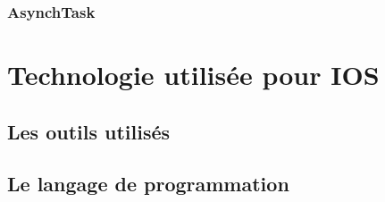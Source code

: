 \subsubsection{AsynchTask}

\section{Technologie utilisée pour IOS}

\subsection{Les outils utilisés}


\subsection{Le langage de programmation}



